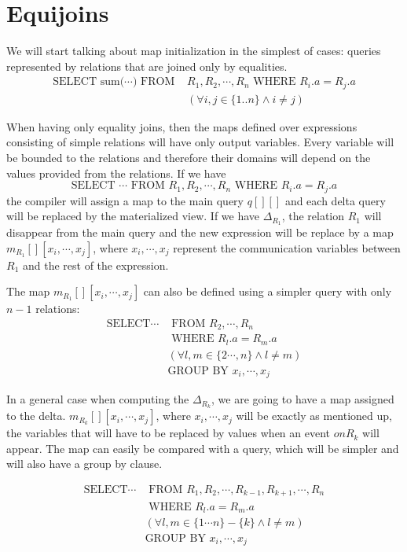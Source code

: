 \documentclass[12pt]{article}
\begin{document}
\section{Equijoins}

We will start talking about map initialization in the simplest of cases: queries represented by relations that are joined only by equalities.
\begin{align*}
\mbox{SELECT sum(}\cdots\mbox{) FROM }&R_1,R_2,\cdots,R_n\mbox{ WHERE }R_i.a=R_j.a \\
&(\forall i,j\in\{1..n\}\land i\not=j)
\end{align*}

When having only equality joins, then the maps defined over expressions consisting of simple relations will have only output variables. Every variable will be bounded to the relations and therefore their domains will depend on the values provided from the relations. If we have $$\mbox{SELECT }\cdots\mbox{ FROM }R_1,R_2,\cdots,R_n\mbox{ WHERE }R_i.a=R_j.a$$ the compiler will assign a map to the main query $q[][]$ and each delta query will be replaced by the materialized view. If we have $\Delta_{R_1}$, the relation $R_1$ will disappear from the main query and the new expression will be replace by a map $m_{R_1}[][x_i,\cdots,x_j]$, where $x_i,\cdots,x_j$ represent the communication variables between $R_1$ and the rest of the expression.

The map $m_{R_{1}}[][x_i,\cdots,x_j]$ can also be defined using a simpler query with only $n-1$ relations:
\begin{align*}
\mbox{SELECT}\cdots&\mbox{ FROM }R_2,\cdots,R_n\\
&\mbox{ WHERE }R_l.a=R_m.a\\
&(\forall l,m\in\{2\cdots,n\}\land l\not=m)\\
&\mbox{GROUP BY } x_i,\cdots,x_j
\end{align*}

In a general case when computing the $\Delta_{R_k}$, we are going to have a map assigned to the delta. $m_{R_k}[][x_i,\cdots,x_j]$, where $x_i,\cdots,x_j$ will be exactly as mentioned up, the variables that will have to be replaced by values when an event $onR_k$ will appear. The map can easily be compared with a query, which will be simpler and will also have a group by clause.

\begin{align*}
\text{SELECT}\cdots&\text{ FROM }R_1,R_2,\cdots,R_{k-1},R_{k+1},\cdots,R_n\\
&\text{ WHERE }R_l.a=R_m.a\\
&(\forall l,m\in\{1\cdots n\}-\{k\}\land l\not=m)\\
&\text{GROUP BY } x_i,\cdots,x_j
\end{align*}
\end{document}
